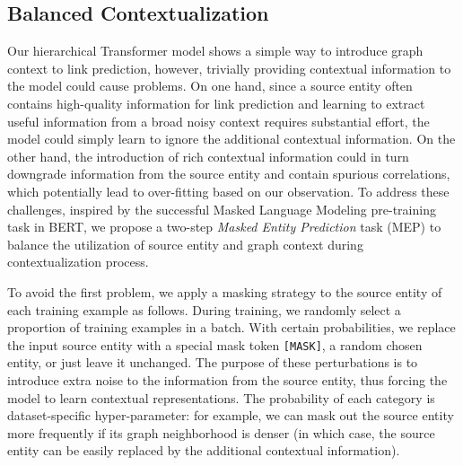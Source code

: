 \documentclass[11pt]{article}
\begin{document}
\subsection{Balanced Contextualization} \label{sec:mem}
Our hierarchical Transformer model shows a simple way to introduce graph context to link prediction, however, trivially providing contextual information to the model could cause problems.
On one hand, since a source entity often contains high-quality information for link prediction and learning to extract useful information from a broad noisy context requires substantial effort, the model could simply learn to ignore the additional contextual information.
On the other hand, the introduction of rich contextual information could in turn downgrade information from the source entity and contain spurious correlations, which potentially lead to over-fitting based on our observation.
To address these challenges, inspired by the successful Masked Language Modeling pre-training task in BERT, we propose a two-step \emph{Masked Entity Prediction} task (MEP) to balance the utilization of source entity and graph context during contextualization process.

To avoid the first problem, we apply a masking strategy to the source entity of each training example as follows.
During training, we randomly select a proportion of training examples in a batch.
With certain probabilities, we replace the input source entity with a special mask token \texttt{[MASK]}, a random chosen entity, or just leave it unchanged.
The purpose of these perturbations is to introduce extra noise to the information from the source entity, thus forcing the model to learn contextual representations.
The probability of each category is dataset-specific hyper-parameter: for example, we can mask out the source entity more frequently if its graph neighborhood is denser (in which case, the source entity can be easily replaced by the additional contextual information).
\end{document}
